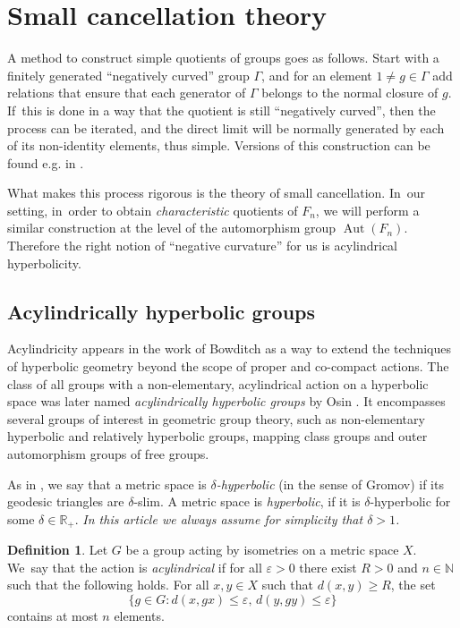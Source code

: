 \documentclass[11pt]{article}
\theoremstyle{definition}
\newtheorem{definition}[theorem]{Definition}
\newcommand{\Aut}{\operatorname{Aut}}
\begin{document}
\section{Small cancellation theory}

A method to construct simple quotients of groups goes as follows. Start with a finitely generated ``negatively curved'' group $\Gamma$, and for an element $1 \neq g \in \Gamma$ add relations that ensure that each generator of $\Gamma$ belongs to the normal closure of $g$. If~this is done in a way that the quotient is still ``negatively curved'', then the process can be iterated, and the direct limit will be normally generated by each of its non-identity elements, thus simple. Versions of this construction can be found e.g. in \cite{Olshanskii:1979b}.

What makes this process rigorous is the theory of small cancellation. In~our setting, in~order to obtain \emph{characteristic} quotients of $F_n$, we will perform a similar construction at the level of the automorphism group $\Aut(F_n)$. Therefore the right notion of ``negative curvature'' for us is acylindrical hyperbolicity.

\subsection{Acylindrically hyperbolic groups}
Acylindricity appears in the work of Bowditch \cite{Bowditch:2008bj} as a way to extend the techniques of hyperbolic geometry beyond the scope of proper and co-compact actions.
The class of all groups with a non-elementary, acylindrical action on a hyperbolic space was later named \emph{acylindrically hyperbolic groups} by Osin \cite{osin}.
It encompasses several groups of interest in geometric group theory, such as non-elementary hyperbolic and relatively hyperbolic groups, mapping class groups and outer automorphism groups of free groups.

As in \cite[III.H, Def.\,1.1]{BH},
we say that a metric space is \emph{$\delta$-hyperbolic} (in the sense of Gromov) if its geodesic triangles are $\delta$-slim.
A metric space is \emph{hyperbolic}, if it is $\delta$-hyperbolic for some $\delta \in\mathbb R_+$.
\emph{In this article we always assume for simplicity that $\delta > 1$.}

\begin{definition}
Let $G$ be a group acting by isometries on a metric space $X$. We~say that the action is \emph{acylindrical} if for all $\varepsilon > 0$ there exist $R > 0$ and $n \in \mathbb{N}$ such that the following holds. For all $x, y \in X$ such that $d(x, y) \geq R$, the set
\[
\{ g \in G : d(x, gx) \leq \varepsilon,\, d(y, gy) \leq \varepsilon \}
\]
contains at most $n$ elements.
\end{definition}
\end{document}
